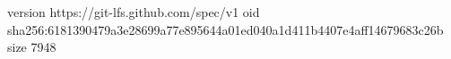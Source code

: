 version https://git-lfs.github.com/spec/v1
oid sha256:6181390479a3e28699a77e895644a01ed040a1d411b4407e4aff14679683c26b
size 7948
